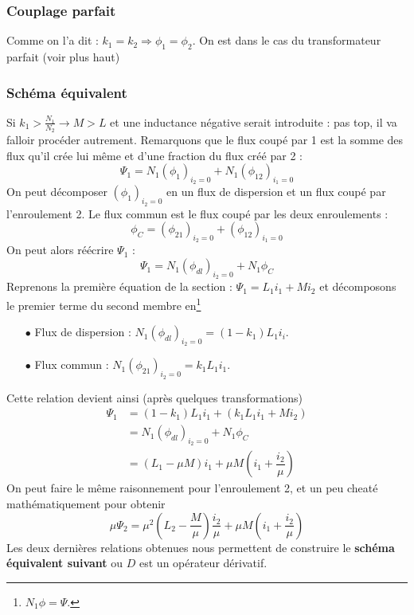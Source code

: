 		\subsubsection{Couplage parfait}
		Comme on l'a dit : $k_1=k_2 \Rightarrow \phi_1=\phi_2$. On est dans le cas du 
		transformateur parfait (voir plus haut)
		
		\subsubsection{Schéma équivalent}
		Si $k_1>\frac{N_1}{N_2} \rightarrow M>L$ et une inductance négative serait 
		introduite : pas top, il va falloir procéder autrement. Remarquons que le 
		flux coupé par 1 est la somme des flux qu'il crée lui même et d'une fraction 
		du flux créé par 2 :
		\begin{equation}
		\Psi_1 = N_1(\phi_1)_{i_2=0} + N_1(\phi_{12})_{i_1=0}
		\end{equation}
		On peut décomposer $(\phi_1)_{i_2=0}$ en un flux de dispersion et un flux 
		coupé par l'enroulement 2. Le flux commun est le flux coupé par les deux 
		enroulements :
		\begin{equation}
		\phi_C = (\phi_{21})_{i_2=0} + (\phi_{12})_{i_1=0}
		\end{equation}
		On peut alors réécrire $\Psi_1$ :
		\begin{equation}
		\Psi_1 = N_1(\phi_{dl})_{i_2=0} + N_1\phi_C
		\end{equation}
		Reprenons la première équation de la section : $\Psi_1 = L_1i_1 + Mi_2$ et 
		décomposons le premier terme du second membre en\footnote{$N_1\phi = \Psi$.}
		\begin{itemize}
		\item[$\bullet$] Flux de dispersion : $N_1(\phi_{dl})_{i_2=0} = (1-k_1)L_1i_i$.
		\item[$\bullet$] Flux commun : $N_1(\phi_{21})_{i_2=0} = k_1L_1i_1$.
		\end{itemize}
		Cette relation devient ainsi (après quelques transformations)
		\begin{equation}
		\begin{array}{ll}
		\Psi_1 &= (1-k_1)L_1i_1 + (k_1L_1i_1 + Mi_2)\\
		 &= N_1(\phi_{dl})_{i_2=0} + N_1\phi_C\\
		 &=\displaystyle (L_1-\mu M)i_1 + \mu M\left(i_1+\dfrac{i_2}{\mu}\right)
		\end{array}
		\end{equation}
		On peut faire le même raisonnement pour l'enroulement 2, et un peu cheaté 
		mathématiquement pour obtenir
		\begin{equation}
		\mu\Psi_2 = \mu^2\left(L_2-\frac{M}{\mu}\right)\frac{i_2}{\mu} + \mu M\left(
		i_1+\frac{i_2}{\mu}\right)
		\end{equation}
		Les deux dernières relations obtenues nous permettent de construire le 
		\textbf{schéma équivalent suivant} ou $D$ est un opérateur dérivatif.\\
		

